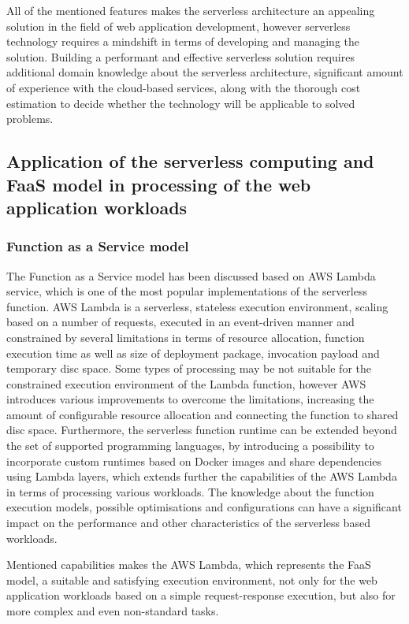 All of the mentioned features makes the serverless architecture an appealing solution in the field of web application development, however serverless technology requires a mindshift in terms of developing and managing the solution.
Building a performant and effective serverless solution requires additional domain knowledge about the serverless architecture, significant amount of experience with the cloud-based services, along with the thorough cost estimation to decide whether the technology will be applicable to solved problems.

\subsection{Application of the serverless computing and FaaS model in processing of the web application workloads}

\subsubsection{Function as a Service model}

The Function as a Service model has been discussed based on AWS Lambda service, which is one of the most popular implementations of the serverless function. 
AWS Lambda is a serverless, stateless execution environment, scaling based on a number of requests, executed in an event-driven manner and constrained by several limitations in terms of resource allocation, function execution time as well as size of deployment package, invocation payload and temporary disc space.
Some types of processing may be not suitable for the constrained execution environment of the Lambda function, however AWS introduces various improvements to overcome the limitations, increasing the amount of configurable resource allocation and connecting the function to shared disc space.
Furthermore, the serverless function runtime can be extended beyond the set of supported programming languages, by introducing a possibility to incorporate custom runtimes based on Docker images and share dependencies using Lambda layers, which extends further the capabilities of the AWS Lambda in terms of processing various workloads.
The knowledge about the function execution models, possible optimisations and configurations can have a significant impact on the performance and other characteristics of the serverless based workloads.

Mentioned capabilities makes the AWS Lambda, which represents the FaaS model, a suitable and satisfying execution environment, not only for the web application workloads based on a simple request-response execution, but also for more complex and even non-standard tasks.

